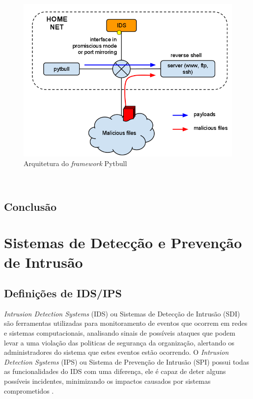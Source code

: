 \documentclass[
	12pt,				
	openright,		
	twoside,	
	a4paper,
	english,	
	brazil	
	]{abntex2}
\begin{document}
 \begin{figure}[!htb]
  \centering
  \includegraphics[scale=.4]{arquitetura_pytbull.png}
  \caption{Arquitetura do \textit{framework} Pytbull}
  \label{fig:pytbull}
 \end{figure}

 \
 \section{Conclusão}
 \chapter{Sistemas de Detecção e Prevenção de Intrusão}
 \section{Definições de IDS/IPS}

 \textit{Intrusion Detection Systems} (IDS) ou Sistemas de Detecção de Intrusão (SDI) são ferramentas utilizadas para monitoramento de eventos que ocorrem em redes e sistemas computacionais, analisando sinais de possíveis ataques que podem levar a uma violação das politicas de segurança da organização, alertando os administradores do sistema que estes eventos estão ocorrendo. O \textit{Intrusion Detection Systems} (IPS) ou Sistema de Prevenção de Intrusão (SPI) possui todas as funcionalidades do IDS com uma diferença, ele é capaz de deter alguns possíveis incidentes, minimizando os impactos causados por sistemas comprometidos \cite{mukhopadhyay01}.
\end{document}
